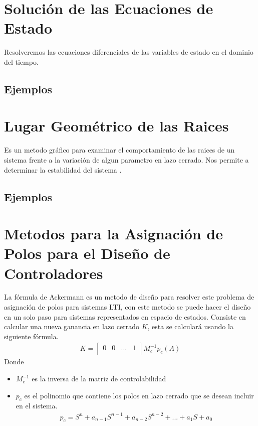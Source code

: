 \documentclass[12pt]{article}
\begin{document}
\section{Solución de las Ecuaciones de Estado}
Resolveremos las ecuaciones diferenciales de las variables de estado en el dominio del tiempo.
\subsection{Ejemplos}
\section{Lugar Geométrico de las Raices}
Es un metodo gráfico para examinar el comportamiento de las raices de un sistema frente a la variación de algun parametro en lazo cerrado. Nos permite a determinar la estabilidad del sistema . 
\subsection{Ejemplos}

\section{Metodos para la Asignación de Polos para el Diseño de Controladores}
La fórmula de Ackermann es un metodo de diseño para resolver este problema de asignación de polos para sistemas LTI, con este metodo se puede hacer el diseño en un solo paso para sistemas representados en espacio de estados.
Consiste en calcular una nueva ganancia en lazo cerrado $K$, esta se calculará usando la siguiente fórmula.
\begin{equation}
    \begin{split}
        K=
        \begin{bmatrix}
            0 & 0 & ... & 1\\
        \end{bmatrix}
        M^{-1}_{c}p_{c}(A)
    \end{split}
    \label{eq:ackermann}
\end{equation}
Donde 
\begin{itemize}
    \item $M^{-1}_{c}$ es la inversa de la matriz de controlabilidad
    \item $p_{c}$ es el polinomio que contiene los polos en lazo cerrado que se desean incluir en el sistema.
    \begin{equation}
        \begin{split}
            p_{c}=S^{n}+a_{n-1}S^{n-1}+a_{n-2}S^{n-2}+...+a_{1}S+a_{0}
        \end{split}
        \label{eq:polo_closed_loop}
    \end{equation}    
\end{itemize}
\end{document}
